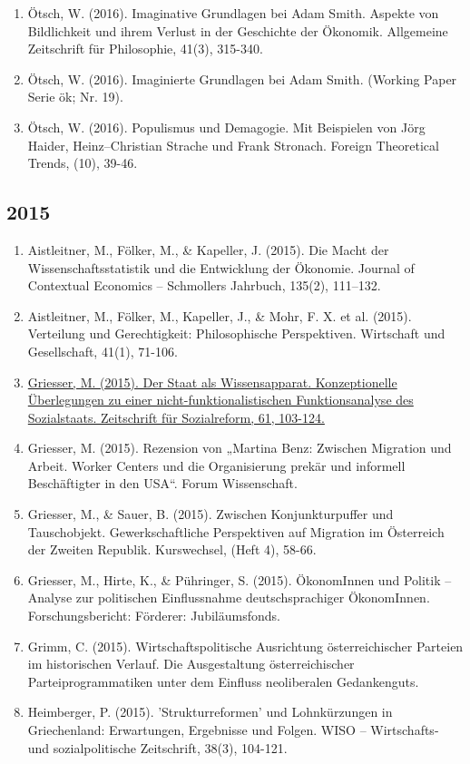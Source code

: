 \begin{enumerate}
	 \item Ötsch, W. (2016). Imaginative Grundlagen bei Adam Smith. Aspekte von Bildlichkeit und ihrem Verlust in der Geschichte der Ökonomik. Allgemeine Zeitschrift für Philosophie, 41(3), 315-340.
	 \item Ötsch, W. (2016). Imaginierte Grundlagen bei Adam Smith. (Working Paper Serie ök; Nr. 19).
	 \item Ötsch, W. (2016). Populismus und Demagogie. Mit Beispielen von Jörg Haider, Heinz–Christian Strache und Frank Stronach. Foreign Theoretical Trends, (10), 39-46.
\end{enumerate}
\subsection*{2015}
\begin{enumerate}
	 \item Aistleitner, M., Fölker, M., \& Kapeller, J. (2015). Die Macht der Wissenschaftsstatistik und die Entwicklung der Ökonomie. Journal of Contextual Economics – Schmollers Jahrbuch, 135(2), 111–132.
	 \item Aistleitner, M., Fölker, M., Kapeller, J., \& Mohr, F. X. et al. (2015). Verteilung und Gerechtigkeit: Philosophische Perspektiven. Wirtschaft und Gesellschaft, 41(1), 71-106.
	 \item \href{https://doi.org/10.1515/zsr-2015-0105}{Griesser, M. (2015). Der Staat als Wissensapparat. Konzeptionelle Überlegungen zu einer nicht-funktionalistischen Funktionsanalyse des Sozialstaats. Zeitschrift für Sozialreform, 61, 103-124.}
	 \item Griesser, M. (2015). Rezension von „Martina Benz: Zwischen Migration und Arbeit. Worker Centers und die Organisierung prekär und informell Beschäftigter in den USA“. Forum Wissenschaft.
	 \item Griesser, M., \& Sauer, B. (2015). Zwischen Konjunkturpuffer und Tauschobjekt. Gewerkschaftliche Perspektiven auf Migration im Österreich der Zweiten Republik. Kurswechsel, (Heft 4), 58-66.
	 \item Griesser, M., Hirte, K., \& Pühringer, S. (2015). ÖkonomInnen und Politik – Analyse zur politischen Einflussnahme deutschsprachiger ÖkonomInnen. Forschungsbericht: Förderer: Jubiläumsfonds.
	 \item Grimm, C. (2015). Wirtschaftspolitische Ausrichtung österreichischer Parteien im historischen Verlauf. Die Ausgestaltung österreichischer Parteiprogrammatiken unter dem Einfluss neoliberalen Gedankenguts.
	 \item Heimberger, P. (2015). 'Strukturreformen' und Lohnkürzungen in Griechenland: Erwartungen, Ergebnisse und Folgen. WISO -- Wirtschafts- und sozialpolitische Zeitschrift, 38(3), 104-121.

\end{enumerate}
